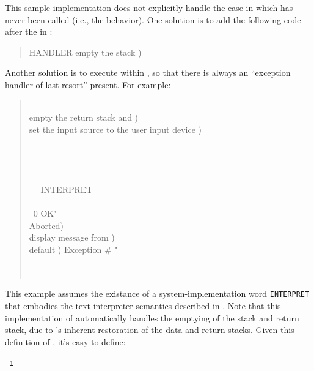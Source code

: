 This sample implementation does not explicitly handle the case in
which  has never been called (i.e., the 
behavior). One solution is to add the following code after the
 in :
\begin{quote}\ttfamily
	HANDLER   
		 empty the stack ) 
\end{quote}
Another solution is to execute  within , so
that there is always an ``exception handler of last resort'' present.
For example:
\begin{quote}\ttfamily
	\word{:}  \\
	\tab {} empty the return stack and ) \\
	\tab {} set the input source to the user input device )\\
	\tab {} \word{[} \\
	\tab {} \\
	\tab~~  \\
	\tab {} \\
	\tab~~ \word{[']} INTERPRET ~ \\
	\tab~~  \\
	\tab\tab ~0     
		 OK"   ~ \\
	\tab{}   Aborted)  \\
	\tab{}   display message from  )  \\
	\tab\tab {} default )   Exception \# " ~  \\
	\tab~~  \\
	\tab {}  \\
	\word{;}
\end{quote}

This example assumes the existance of a system-implementation word
\texttt{INTERPRET} that embodies the text interpreter semantics
described in .
Note that this implementation of  automatically handles
the emptying of the stack and return stack, due to
's inherent restoration of the data and return
stacks. Given this definition of , it's easy to define:

\tab \word{:} 
	\texttt{-1} 
\word{;}


